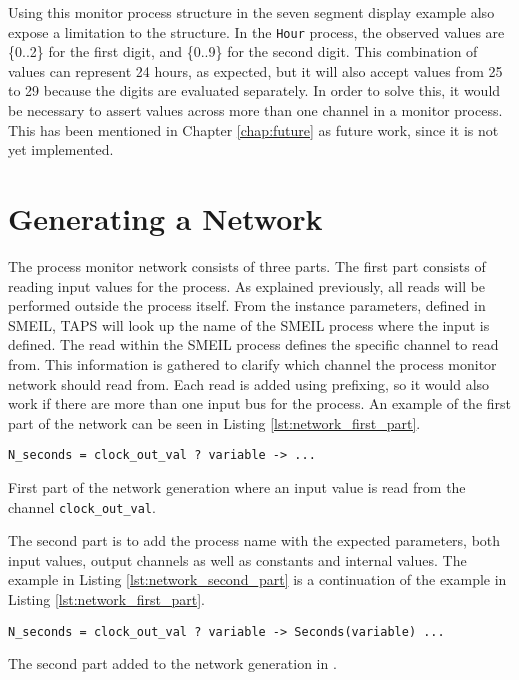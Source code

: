 Using this monitor process structure in the seven segment display example also expose a limitation to the structure. In the \texttt{Hour} process, the observed values are \{0..2\} for the first digit, and \{0..9\} for the second digit. This combination of values can represent 24 hours, as expected, but it will also accept values from 25 to 29 because the digits are evaluated separately. In order to solve this, it would be necessary to assert values across more than one channel in a monitor process. This has been mentioned in Chapter \ref{chap:future} as future work, since it is not yet implemented.
\section{Generating a \cspm{} Network}
The process monitor network consists of three parts. The first part consists of reading input values for the process. As explained previously, all reads will be performed outside the process itself. From the instance parameters, defined in SMEIL, TAPS will look up the name of the SMEIL process where the input is defined. The read within the SMEIL process defines the specific channel to read from. This information is gathered to clarify which \cspm{} channel the process monitor network should read from. Each read is added using prefixing, so it would also work if there are more than one input bus for the process. An example of the first part of the network can be seen in Listing \ref{lst:network_first_part}.
\begin{listing}
\begin{verbatim}
N_seconds = clock_out_val ? variable -> ...
\end{verbatim}
\caption{First part of the network generation where an input value is read from the channel \texttt{clock\_out\_val}.}
\label{lst:network_first_part}
\end{listing}
The second part is to add the process name with the expected parameters, both input values, output channels as well as constants and internal values. The example in Listing \ref{lst:network_second_part} is a continuation of the example in Listing \ref{lst:network_first_part}.
\begin{listing}
\begin{verbatim}
N_seconds = clock_out_val ? variable -> Seconds(variable) ...
\end{verbatim}
\caption{The second part added to the network generation in \cspm{}.}
\label{lst:network_second_part}
\end{listing}


